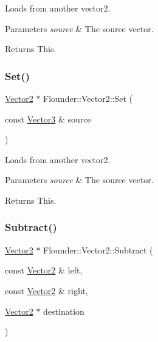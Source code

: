 Loads from another vector2. 


\begin{DoxyParams}{Parameters}
{\em source} & The source vector. \\
\hline
\end{DoxyParams}
\begin{DoxyReturn}{Returns}
This. 
\end{DoxyReturn}
\mbox{\label{class_flounder_1_1_vector2_ac7556748d81349995a85a9c9b7d88c1c}} 
\subsubsection{\texorpdfstring{Set()}{Set()}\hspace{0.1cm}{\footnotesize\ttfamily [3/3]}}
{\footnotesize\ttfamily \hyperlink{class_flounder_1_1_vector2}{Vector2} $\ast$ Flounder\+::\+Vector2\+::\+Set (\begin{DoxyParamCaption}\item[{const \hyperlink{class_flounder_1_1_vector3}{Vector3} \&}]{source }\end{DoxyParamCaption})}



Loads from another vector2. 


\begin{DoxyParams}{Parameters}
{\em source} & The source vector. \\
\hline
\end{DoxyParams}
\begin{DoxyReturn}{Returns}
This. 
\end{DoxyReturn}
\mbox{\label{class_flounder_1_1_vector2_a87d6a6539da815fe9a3ccfd7514bbe0d}} 
\subsubsection{\texorpdfstring{Subtract()}{Subtract()}}
{\footnotesize\ttfamily \hyperlink{class_flounder_1_1_vector2}{Vector2} $\ast$ Flounder\+::\+Vector2\+::\+Subtract (\begin{DoxyParamCaption}\item[{const \hyperlink{class_flounder_1_1_vector2}{Vector2} \&}]{left,  }\item[{const \hyperlink{class_flounder_1_1_vector2}{Vector2} \&}]{right,  }\item[{\hyperlink{class_flounder_1_1_vector2}{Vector2} $\ast$}]{destination }\end{DoxyParamCaption})\hspace{0.3cm}{\ttfamily [static]}}



